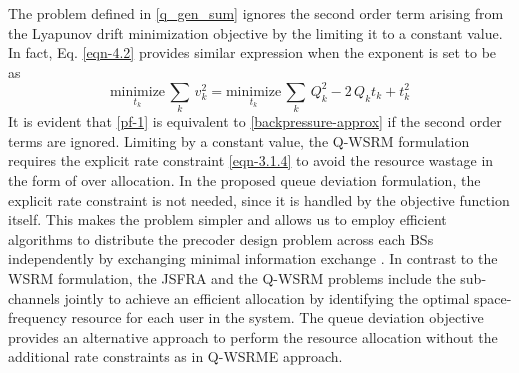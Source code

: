 The problem defined in \eqref{q_gen_sum} ignores the second order term arising from the Lyapunov drift minimization objective by the limiting it to a constant value. In fact, Eq. \eqref{eqn-4.2} provides similar expression when the exponent is set to be  as
\begin{equation}\label{pf-1}
\underset{t_k}{\text{minimize}} \, \sum_k \, v_k^2 = \underset{t_k}{\text{minimize}} \, \sum_k \, Q_k^2 - 2 \, Q_k t_k + t_k^2
\end{equation}
It is evident that \eqref{pf-1} is equivalent to \eqref{backpressure-approx} if the second order terms are ignored. Limiting  by a constant value, the \ac{Q-WSRM} formulation requires the explicit rate constraint \eqref{eqn-3.1.4} to avoid the resource wastage in the form of over allocation. In the proposed queue deviation formulation, the explicit rate constraint is not needed, since it is handled by the objective function itself. This makes the problem simpler and allows us to employ efficient algorithms to distribute the precoder design problem across each \acp{BS} independently by exchanging minimal information exchange \cite{boyd2011distributed}. In contrast to the \ac{WSRM} formulation, the \ac{JSFRA} and the \ac{Q-WSRM} problems include the sub-channels jointly to achieve an efficient allocation by identifying the optimal space-frequency resource for each user in the system. The queue deviation objective provides an alternative approach to perform the resource allocation without the additional rate constraints as in \ac{Q-WSRME} approach.
